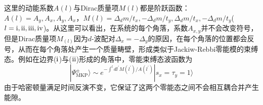 这里的动能系数$A(l)$与Dirac质量项$M(l)$都是阶跃函数：$A(l)=A_y,A_x,A_y,A_x$，$M(l)=\Delta_dm/t_x,-\Delta_dm/t_y,\Delta_dm/t_x,-\Delta_dm/t_y$($l=\mathrm{\uppercase\expandafter{\romannumeral1},\uppercase\expandafter{\romannumeral2},\uppercase\expandafter{\romannumeral3},\uppercase\expandafter{\romannumeral4}}$)。从这里可以看出，在系统的每个角落，系数$A_{x,y}$并不会改变符号，但是Dirac质量项$M_(l)$因为$d$-波配对$\Delta_x=-\Delta_y$的原因，在每个角落的位置都会反号，从而在每个角落处产生一个质量畴壁，形成类似于Jackiw-Rebbi零能模\cite{re43,re44}的束缚态。例如在边界($\mathrm{\uppercase\expandafter{\romannumeral1}}$)与($\mathrm{\uppercase\expandafter{\romannumeral2}}$)形成的角落中，零能束缚态波函数为
\begin{equation}
|\Psi^\pm_{\mathrm{MKP}}\rangle\sim e^{-\int^ldl^{'}M(l^{'})/A(l^{'})}|s_x=\tau_y=1\rangle
\end{equation}
由于哈密顿量满足时间反演不变，它保证了这两个零能态之间不会相互耦合并产生能隙。

